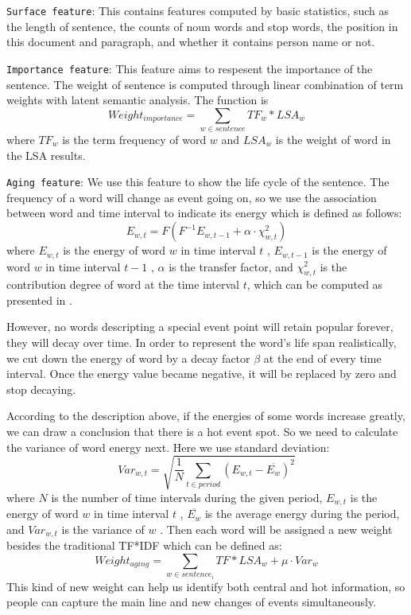 \documentclass[print]{jicspack}
\begin{document}
\texttt{Surface feature}: This contains features computed by basic statistics, such as the length of sentence, the counts of noun words and stop words, the position in this document and paragraph, and whether it contains person name or not. %

\texttt{Importance feature}: This feature aims to respesent the importance of the sentence. The weight of sentence is computed through linear combination of term weights with latent semantic analysis. The function is 
\begin{equation}
Weight_{importance} = \sum_{w \in sentence}TF_w * LSA_w
\end{equation}
where $TF_w$ is the term frequency of word $w$ and $LSA_w$ is the weight of word in the LSA results.

\texttt{Aging feature}: We use this feature to show the life cycle of the sentence. The frequency of a word will change as event going on, so we use the association between word  and time interval  to indicate its energy which is defined as follows:
\begin{equation}
  E_{w,t} =F(F^{-1}E_{w,t-1}+\alpha\cdot\chi^2_{w,t})
\end{equation}
where $E_{w,t}$ is the energy of word $w$  in time interval $t$ , $E_{w,t-1}$  is the energy of word $w$ in time interval $t-1$ , $\alpha$ is the transfer factor, and $\chi^2_{w,t}$  is the contribution degree of word  at the time interval $t$, which can be computed as presented in \cite{2000-Swan-p49-56}. 

However, no words descripting a special event point will retain popular forever, they will decay over time. In order to represent the word's life span realistically, we cut down the energy of word by a decay factor $\beta$ at the end of every time interval.
Once the energy value became negative, it will be replaced by zero and stop decaying.


According to the description above, if the energies of some words increase greatly, we can draw a conclusion that there is a hot event spot. So we need to calculate the variance of word energy next. Here we use standard deviation:
\begin{equation}
Var_{w,t} = \sqrt{ \frac{1}{N} \sum_{t \in period}(E_{w,t}- \overline{E_{w}})^2}
\end{equation}
where $N$ is the number of time intervals during the given period, $E_{w,t}$  is the energy of word $w$  in time interval $t$ , $\overline{E_{w}}$  is the average energy during the period, and $Var_{w,t}$  is the variance of $w$ .
Then each word will be assigned a new weight besides the traditional TF*IDF which can be defined as:
 \begin{equation}
Weight_{aging}=\sum_{w \in sentence_i}TF*LSA_{w} + \mu \cdot Var_{w}
\end{equation}
This kind of new weight can help us identify both central and hot information, so people can capture the main line and new changes of events simultaneously.
\end{document}
